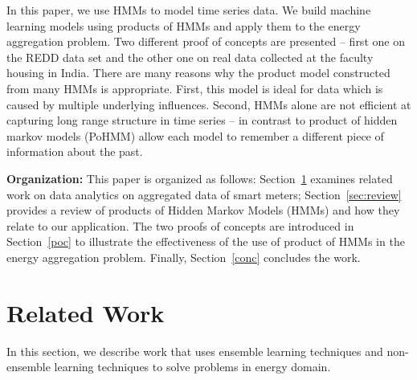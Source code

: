 \documentclass{sig-alternate}
\begin{document}
In this paper, we use HMMs to model time series data. We build machine learning models using products of HMMs and apply them to the energy aggregation problem. Two different proof of concepts are presented -- first one on the REDD data set and the other one on real data collected at the faculty housing in India. 
There are many reasons why the product model constructed from many HMMs is appropriate. First, this model is ideal for data which is caused by multiple underlying influences. Second, HMMs alone are not efficient at capturing long range structure in time series \cite{Taylor} -- in contrast to product of hidden markov models (PoHMM)  \cite{andrew} allow each model to remember a different piece of information about the past.

\noindent \textbf{Organization:} This paper is organized as follows: Section~\ref{related} examines related work on data analytics on aggregated data of smart meters; Section~\ref{sec:review} provides a review of products of Hidden Markov Models (HMMs) and how they relate to our application. The two proofs of concepts are introduced in Section~\ref{poc} to illustrate the effectiveness of the use of product of HMMs in the energy aggregation problem. Finally, Section~\ref{conc} concludes the work.

\section{Related Work}
\label{related}
In this section, we describe work that uses ensemble learning techniques and non-ensemble learning techniques to solve problems in energy domain.
\end{document}
